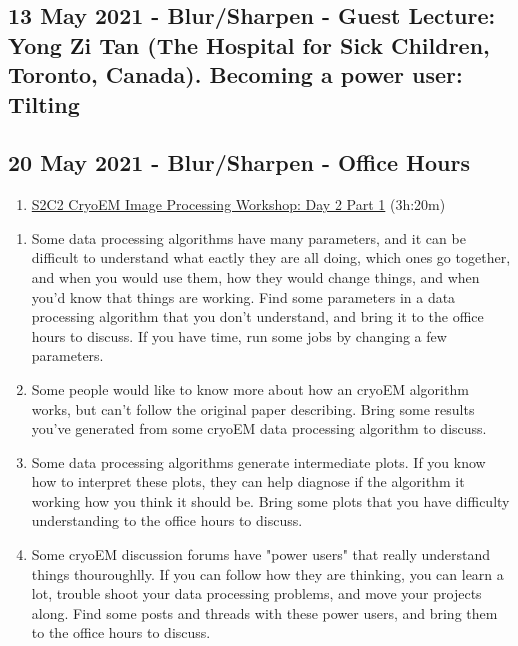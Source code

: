 \documentclass[11pt, oneside]{article}   	%
\begin{document}
\subsection{13 May 2021 - Blur/Sharpen - Guest Lecture: Yong Zi Tan (The Hospital for Sick Children, Toronto, Canada). Becoming a power user: Tilting}

\subsection{20 May 2021 - Blur/Sharpen - Office Hours}
\begin{enumerate}
	\item \href{https://youtu.be/ehXqLnV_Jr4}{S2C2 CryoEM Image Processing Workshop: Day 2 Part 1} (3h:20m)
	\end{enumerate}
\begin{enumerate}
	\item Some data processing algorithms have many parameters, and it can be difficult to understand what eactly they are all doing, which ones go together, and when you would use them, how they would change things, and when you'd know that things are working. Find some parameters in a data processing algorithm that you don't understand, and bring it to the office hours to discuss. If you have time, run some jobs by changing a few parameters.
	\item Some people would like to know more about how an cryoEM algorithm works, but can't follow the original paper describing. Bring some results you've generated from some cryoEM data processing algorithm to discuss.
	\item Some data processing algorithms generate intermediate plots. If you know how to interpret these plots, they can help diagnose if the algorithm it working how you think it should be. Bring some plots that you have difficulty understanding to the office hours to discuss.  
	\item Some cryoEM discussion forums have "power users" that really understand things thouroughlly. If you can follow how they are thinking, you can learn a lot, trouble shoot your data processing problems, and move your projects along. Find some posts and threads with these power users, and bring them to the office hours to discuss.
\end{enumerate}
\end{document}

